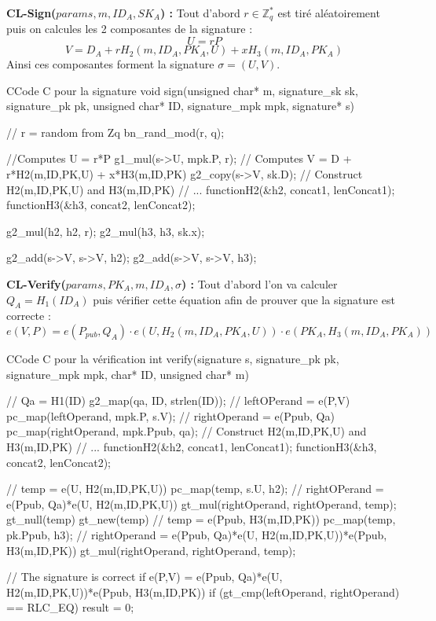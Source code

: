 \textbf{CL-Sign($params, m, ID_A, SK_A$) :} Tout d'abord $r \in \mathbb{Z}_q^*$ est tiré aléatoirement puis on calcules les 2 composantes de la signature :
\[ U = rP\]
\[V = D_A + rH_2(m, ID_A, PK_A,U) + xH_3(m, ID_A, PK_A)\]
Ainsi ces composantes forment la signature $\sigma = (U,V)$.

\begin{sourcebox}{C}{Code C pour la signature}
	void sign(unsigned char* m, signature_sk sk, signature_pk pk, unsigned char* ID, signature_mpk mpk, signature* s){
		// r = random from Zq
		bn_rand_mod(r, q);
		
		//Computes U = r*P
		g1_mul(s->U, mpk.P, r);
		// Computes V = D + r*H2(m,ID,PK,U) + x*H3(m,ID,PK)
		g2_copy(s->V, sk.D);
		// Construct H2(m,ID,PK,U) and H3(m,ID,PK)
		// ...
		functionH2(&h2, concat1, lenConcat1);
		functionH3(&h3, concat2, lenConcat2);
		
		g2_mul(h2, h2, r);
		g2_mul(h3, h3, sk.x);
		
		g2_add(s->V, s->V, h2);
		g2_add(s->V, s->V, h3);
	}
\end{sourcebox}

\textbf{CL-Verify($params, PK_A,  m, ID_A, \sigma$) :} Tout d'abord l'on va calculer $Q_A = H_1(ID_A)$ puis vérifier cette équation afin de prouver que la signature est correcte :
\[e(V,P) = e(P_{pub}, Q_A) \cdot e(U, H_2(m, ID_A, PK_A,U)) \cdot e(PK_A, H_3(m, ID_A, PK_A)) \]

\begin{sourcebox}{C}{Code C pour la vérification}
	int verify(signature s, signature_pk pk, signature_mpk mpk, char* ID, unsigned char* m){
		// Qa = H1(ID)
		g2_map(qa, ID, strlen(ID));
		// leftOPerand = e(P,V)
		pc_map(leftOperand, mpk.P, s.V);
		// rightOperand = e(Ppub, Qa)
		pc_map(rightOperand, mpk.Ppub, qa);
		// Construct H2(m,ID,PK,U) and H3(m,ID,PK)
		// ...
		functionH2(&h2, concat1, lenConcat1);
		functionH3(&h3, concat2, lenConcat2);
		
		// temp = e(U, H2(m,ID,PK,U))
		pc_map(temp, s.U, h2);
		// rightOPerand = e(Ppub, Qa)*e(U, H2(m,ID,PK,U))
		gt_mul(rightOperand, rightOperand, temp);
		gt_null(temp)
		gt_new(temp)
		// temp = e(Ppub, H3(m,ID,PK))
		pc_map(temp, pk.Ppub, h3);
		// rightOperand = e(Ppub, Qa)*e(U, H2(m,ID,PK,U))*e(Ppub, H3(m,ID,PK))
		gt_mul(rightOperand, rightOperand, temp);
		
		// The signature is correct if e(P,V) = e(Ppub, Qa)*e(U, H2(m,ID,PK,U))*e(Ppub, H3(m,ID,PK))
		if (gt_cmp(leftOperand, rightOperand) == RLC_EQ) {
			result = 0;
		}
	}
\end{sourcebox}

